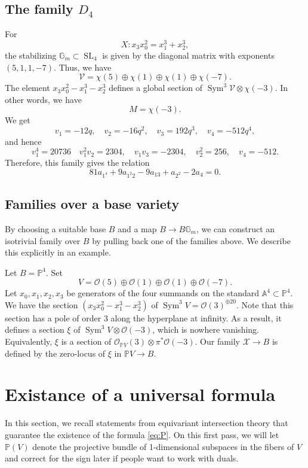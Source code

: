 \documentclass[12 pt]{amsart}
\renewcommand{\P}{\mathbb{P}}
\newcommand{\SL}{\operatorname{SL}}
\newcommand{\<}{\left\langle}
\renewcommand{\>}{\right\rangle}
\DeclareMathOperator{\sym}{Sym}
\begin{document}
\subsection{The family $D_4$}
For
\[ X: x_3x_0^2 = x_1^3+x_2^3,\]
the stabilizing $\mathbb G_m \subset \SL_4$ is given by the diagonal matrix with exponents $(5,1,1,-7)$.
Thus, we have
\[ \mathcal V = \chi(5) \oplus \chi(1) \oplus \chi(1) \oplus \chi(-7).\]
The element $x_3x_0^2-x_1^3-x_2^3$ defines a global section of $\sym^3 \mathcal V \otimes \chi(-3)$.
In other words, we have
\[ M = \chi(-3).\]
We get
\[ v_1 = -12q, \quad v_2 = -16q^2, \quad v_3 = 192q^3, \quad v_4 = -512q^4,\]
and hence
\[ v_1^4 = 20736 \quad v_1^2v_2 = 2304, \quad v_1v_3 = -2304, \quad v_2^2 = 256, \quad v_4 = -512.\]
Therefore, this family gives the relation
\begin{equation}\label{eqn:iso4}
  81a_{1^4} +9a_{1^2 2}- 9a_{13} +  a_{2^2}-2a_4  = 0.
\end{equation}

\subsection{Families over a base variety}
By choosing a suitable base $B$ and a map $B \to B \mathbb G_m$, we can construct an isotrivial family over $B$ by pulling back one of the families above.
We describe this explicitly in an example.

Let $B = \mathbb P^4$.
Set
\[V = \mathcal O(5) \oplus \mathcal O(1) \oplus \mathcal O(1) \oplus \mathcal O(-7).\]
Let $x_0, x_1, x_2, x_3$ be generators of the four summands on the standard $\mathbb A^4 \subset \mathbb P^4$.
We have the section $(x_3x_0^2-x_1^3-x_2^3)$ of $\sym^3 V = \mathcal O(3)^{\oplus 20}$.
Note that this section has a pole of order $3$ along the hyperplane at infinity.
As a result, it defines a section $\xi$ of $\sym^3 V \otimes \mathcal O(-3)$, which is nowhere vanishing.
Equivalently, $\xi$ is a section of $\mathcal O_{\P V}(3) \otimes \pi^* \mathcal O(-3)$.
Our family $\mathcal X \to B$ is defined by the zero-locus of $\xi$ in $\P V  \to B$.

\appendix

\section{Existance of a universal formula}

In this section, we recall statements from equivariant intersection theory that guarantee the existence of the formula \eqref{eq:P}. On this first pass, we will let $\mathbb{P}(V)$ denote the projective bundle of 1-dimensional subspaces in the fibers of $V$ and correct for the sign later if people want to work with duals. 
\end{document}
